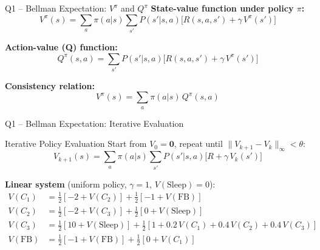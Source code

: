 \documentclass[aspectratio=169,12pt]{beamer}
\newcommand{\Vpi}{V^{\pi}}
\newcommand{\Qpi}{Q^{\pi}}
\begin{document}
\begin{frame}{Q1 -- Bellman Expectation: $\Vpi$ and $\Qpi$}
  \textbf{State-value function under policy $\pi$:}
  \[
    \boxed{\Vpi(s) = \sum_a \pi(a|s)\sum_{s'} P(s'|s,a)\bigl[R(s,a,s') + \gamma\,\Vpi(s')\bigr]}
  \]

  \textbf{Action-value (Q) function:}
  \[
    \boxed{\Qpi(s,a) = \sum_{s'} P(s'|s,a)\bigl[R(s,a,s') + \gamma\,\Vpi(s')\bigr]}
  \]

  \textbf{Consistency relation:}
  \[
    \Vpi(s) = \sum_a \pi(a|s)\,\Qpi(s,a)
  \]
\end{frame}

\begin{frame}{Q1 -- Bellman Expectation: Iterative Evaluation}
  \begin{block}{Iterative Policy Evaluation}
    Start from $V_0 = \mathbf{0}$, repeat until $\|V_{k+1}-V_k\|_\infty < \theta$:
    \[
      V_{k+1}(s) = \sum_a \pi(a|s)\sum_{s'} P(s'|s,a)\bigl[R + \gamma\,V_k(s')\bigr]
    \]
  \end{block}

  \medskip
  \textbf{Linear system} (uniform policy, $\gamma=1$, $V(\text{Sleep})=0$):
  \small
  \begin{align*}
    V(C_1) &= \tfrac{1}{2}[-2+V(C_2)] + \tfrac{1}{2}[-1+V(\text{FB})]\\
    V(C_2) &= \tfrac{1}{2}[-2+V(C_3)] + \tfrac{1}{2}[0+V(\text{Sleep})]\\
    V(C_3) &= \tfrac{1}{2}[10+V(\text{Sleep})] + \tfrac{1}{2}[1+0.2\,V(C_1)+0.4\,V(C_2)+0.4\,V(C_3)]\\
    V(\text{FB}) &= \tfrac{1}{2}[-1+V(\text{FB})] + \tfrac{1}{2}[0+V(C_1)]
  \end{align*}
\end{frame}
\end{document}

